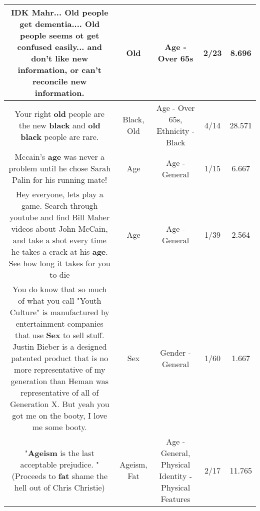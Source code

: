 \documentclass[11pt]{article}
\newlength\mylength
\begin{document}
\begin{center}
\begin{longtable}{|C{.65\mylength}|C{.30\mylength}|C{.12\mylength}|C{.12\mylength}|C{.12\mylength}|}
  \small IDK Mahr... \textbf{Old} people get dementia.... \textbf{Old} people seems ot get confused easily... and don't like new information, or can't reconcile new information.\normalsize   & Old & Age - Over 65s & 2/23 & 8.696 \\  \hline
  \small Your right \textbf{old} people are the new \textbf{black} and \textbf{old} \textbf{black} people are rare.\normalsize   & Black, Old & Age - Over 65s, Ethnicity - Black & 4/14 & 28.571 \\  \hline
  \small Mccain's \textbf{age} was never a problem until he chose Sarah Palin for his running mate!\normalsize   & Age & Age - General & 1/15 & 6.667 \\  \hline
  \small Hey everyone, lets play a game. Search through youtube and find Bill Maher videos about John McCain, and take a shot every time he takes a crack at his \textbf{age}. See how long it takes for you to die\normalsize   & Age & Age - General & 1/39 & 2.564 \\  \hline
  \small You do know that so much of what you call "Youth Culture" is manufactured by entertainment companies that use \textbf{Sex} to sell stuff. Justin Bieber is a designed patented product that is no more representative of my generation than Heman was representative of all of Generation X. But yeah you got me on the booty, I love me some booty.\normalsize   & Sex & Gender - General & 1/60 & 1.667 \\  \hline
  \small "\textbf{Ageism} is the last acceptable prejudice. "(Proceeds to \textbf{fat} shame the hell out of Chris Christie)\normalsize   & Ageism, Fat & Age - General, Physical Identity - Physical Features & 2/17 & 11.765 \\  \hline

\end{longtable}
\end{center}
\end{document}
